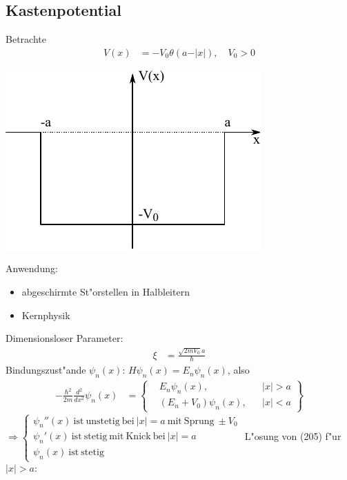 \documentclass[a4paper]{scrartcl}
\begin{document}
{\subsection{Kastenpotential}
Betrachte
\begin{align}
V(x) & = - V_0 \theta(a - \vert x \vert), \quad V_0 > 0
\end{align}
\begin{center}
\includegraphics{203Katenpot}
\end{center}
Anwendung:
\begin{itemize}
\item abgeschirmte St"orstellen in Halbleitern
\item Kernphysik
\end{itemize}
Dimensionsloser Parameter:
\begin{align}
\xi & = \frac{\sqrt{2 m V_0} a}{\hbar}
\end{align}
Bindungszust"ande $\psi_n(x)$: $H \psi_n(x) = E_n \psi_n(x)$, also 
\begin{align}
- \frac{ \hbar^2}{2m} \frac{d^2}{dx^2} \psi_n(x) & = \left\{ \begin{aligned} & E_n \psi_n(x), && \vert x \vert > a \\ & (E_n + V_0) \psi_n(x), && \vert x \vert < a \end{aligned} \right\}
\end{align}
$\Longrightarrow \begin{cases} \psi_n''(x) \mathrm{ \ ist \ unstetig \ bei \ } \vert x \vert = a \mathrm{ \ mit \ Sprung \ } \pm V_0 \\
\psi_n'(x) \mathrm{ \ ist \ stetig \ mit \ Knick \ bei \ } \vert x \vert = a \\ \psi_n(x) \mathrm{ \ ist \ stetig} \end{cases}$
L"osung von (205) f"ur $\vert x \vert > a$:

}
\end{document}
